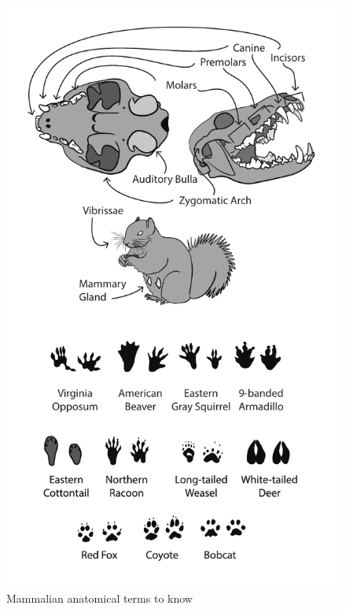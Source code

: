 \documentclass[a4paper,12pt]{article}
\begin{document}
\begin{figure}[H]
\centering
  \includegraphics{MammalAnatomy.pdf}
  \caption{Mammalian anatomical terms to know}
  \label{fig:MammalAnatomy}
\end{figure}
\end{document}

